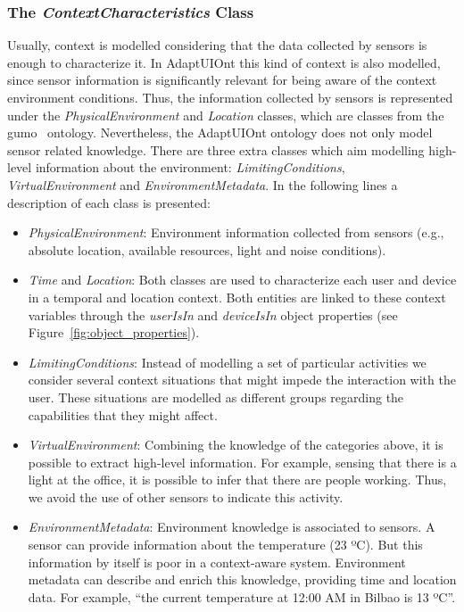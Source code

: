 \subsubsection{The \textit{ContextCharacteristics} Class}
\label{sec:context_characteristics_class}

Usually, context is modelled considering that the data collected by sensors is
enough to characterize it. In AdaptUIOnt this kind of context is also modelled,
since sensor information is significantly relevant for being aware of the context
environment conditions. Thus, the information collected by sensors is represented
under the \textit{PhysicalEnvironment} and \textit{Location} classes, which are
classes from the \ac{gumo}~\citep{heckmann_gumogeneral_2005} ontology. Nevertheless,
the AdaptUIOnt ontology does not only model sensor related knowledge. There are
three extra classes which aim modelling high-level information about the
environment: \textit{LimitingConditions}, \textit{VirtualEnvironment} and
\textit{EnvironmentMetadata}. In the following lines a description of each class
is presented:

\begin{itemize}
 \item \textit{PhysicalEnvironment}: Environment information collected from
 sensors (e.g., absolute location, available resources, light and noise conditions).
 
 \item \textit{Time} and \textit{Location}: Both classes are used to characterize
 each user and device in a temporal and location context. Both entities are linked
 to these context variables through the \textit{userIsIn} and \textit{deviceIsIn}
 object properties (see Figure~\ref{fig:object_properties}).
 
 \item \textit{LimitingConditions}: Instead of modelling a set of particular
 activities we consider several context situations that might impede the interaction
 with the user. These situations are modelled as different groups regarding the
 capabilities that they might affect.
 
 \item \textit{VirtualEnvironment}: Combining the knowledge of the categories
 above, it is possible to extract high-level information. For example, sensing
 that there is a light at the office, it is possible to infer that there are
 people working. Thus, we avoid the use of other sensors to indicate this
 activity.
 
 \item \textit{EnvironmentMetadata}: Environment knowledge is associated to
 sensors. A sensor can provide information about the temperature (23 ºC). But
 this information by itself is poor in a context-aware system. Environment metadata
 can describe and enrich this knowledge, providing time and location data. For
 example, ``the current temperature at 12:00 AM in Bilbao is 13 ºC''.
\end{itemize}


